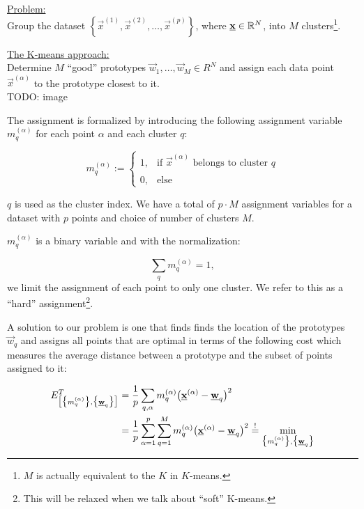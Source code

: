 \begin{frame}

\underline{Problem:}\\

Group the dataset $\left\{ \vec x^{(1)}, \vec x^{(2)}, \ldots, \vec x^{(p)} \right\}$, where $\underline{\mathbf{x}} \in \mathbb{R}^N$, into $M$ clusters\footnote{$M$ is actually equivalent to the $K$ in $K$-means.}.

\underline{The K-means approach:}\\

Determine $M$ ``good'' prototypes $\vec w_1, \ldots, \vec w_M \in R^N$ and assign each data point $\vec x^{(\alpha)}$ to the prototype closest to it.\\

TODO: image

The assignment is formalized by introducing the following assignment variable $m_q^{(\alpha)}$ for each point $\alpha$ and each cluster $q$:

\begin{equation}
\label{eq:assignment}
	m_q^{(\alpha)} := \left\{ \begin{array}{ll}
		1, & \text{if } \vec{x}^{(\alpha)} \text{ belongs to cluster } q
		\\\\
		0, & \text{else}
	\end{array} \right. 
\end{equation}

$q$ is used as the cluster index. We have a total of $p \cdot M$ assignment variables for a dataset with $p$ points and choice of number of clusters $M$.

$m_q^{(\alpha)}$ is a binary variable and with the normalization:

\begin{equation}
    \label{eq:assignmentnormalization}
	\sum\limits_q m_q^{(\alpha)} = 1,
\end{equation}
we limit the assignment of each point to only one cluster. We refer to this as a ``hard'' assignment\footnote{This will be relaxed when we talk about ``soft'' K-means.}.

A solution to our problem is one that finds finds the location of the prototypes $\vec w_q$ and assigns all points that are optimal in terms of the following cost which measures the average distance between a prototype and the subset of points assigned to it:

\begin{align}
\label{eq:kmeanscost}
E_{ \big[ \big\{ m_q^{(\alpha)} \big\}, \big\{ \underline{\mathbf{w}}_q \big\} 
		\big] }^T &= \frac{1}{p} \sum\limits_{q,\alpha} m_q^{(\alpha)}
		\big( \underline{\mathbf{x}}^{(\alpha)} - \underline{\mathbf{w}}_q \big)^2\\
        &= \frac{1}{p} \sum_{\alpha=1}^{p} \sum_{q=1}^{M} m_q^{(\alpha)}
		\big( \underline{\mathbf{x}}^{(\alpha)} - \underline{\mathbf{w}}_q \big)^2 \stackrel{\mathrm{!}}{=} \underset{\big\{ m_q^{(\alpha)} \big\}, \big\{ \underline{\mathbf{w}}_q \big\}}{\min}
\end{align}


\end{frame}
